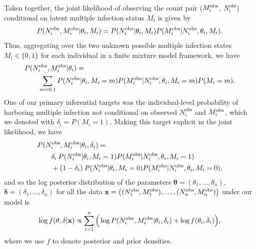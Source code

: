 \documentclass[10pt,letterpaper]{article}
\newcommand{\MI}{M^{\text{\text{obs}}}}
\begin{document}
Taken together, the joint likelihood of observing the count pair  ($\MI_i$, $N^{\text{obs}}_i$) conditional on latent multiple infection status $M_i$ is given by 
\begin{equation}
P(N^{\text{obs}}_i, \MI_i | \theta_i, M_i) = P(N^{\text{obs}}_i |  \theta_i, M_i)P(\MI_i | N^{\text{obs}}_i, \theta_i, M_i).
\end{equation}
Thus, aggregating over the two unknown possible multiple infection states $M_i\in\{0,1\}$ for each individual in a finite mixture model framework, we have
\begin{equation}
\begin{split}
& P(N^{\text{obs}}_i, \MI_i | \theta_i) = \\
&\quad\quad \sum_{m = 0,1} P(N^{\text{obs}}_i | \theta_i, M_i=m)P(\MI_i | N^{\text{obs}}_i, \theta_i, M_i=m)P(M_i=m).
\end{split}
\end{equation}
One of our primary inferential targets was the individual-level probability of harboring multiple infection not conditional on observed $N^\text{obs}_i$ and $\MI_i$, which we denoted with $\delta_i = P(M_i = 1)$. Making this target explicit in the joint likelihood, we have
\begin{subequations}
    \begin{align}
    &P(N^{\text{obs}}_i, \MI_i | \theta_i, \delta_i) = \\
    &\quad\quad \delta_i \: P(N^{\text{obs}}_i | \theta_i, M_i=1)P(\MI_i | N^{\text{obs}}_i, \theta_i, M_i=1) \\ 
    & \quad\quad + (1-\delta_i)\: P(N^{\text{obs}}_i | \theta_i, M_i=0)P(\MI_i | N^{\text{obs}}_i, \theta_i, M_i=0),
    \end{align}
\end{subequations}
and so the log posterior distribution of the parameters $\mathbf{\theta} = (\theta_1,\dotsc,\theta_n)$, $\mathbf{\delta} = (\delta_1,\dotsc,\delta_n)$ for all the data $\mathbf{x} = \big( (N^{\text{obs}}_1, \MI_1),\dotsc,(N^{\text{obs}}_n, \MI_n)\big)$  under our model is
\begin{equation}
\log f(\mathbf{\theta}, \mathbf{\delta} | \mathbf{x}) \propto \sum_{i=1}^n \Big( \log P(N^{\text{obs}}_i, \MI_i | \theta_i, \delta_i) + \log f(\theta_i,\delta_i) \Big),
\label{eq:model_ind_posterior}
\end{equation}
where we use $f$ to denote posterior and prior densities.
\end{document}
